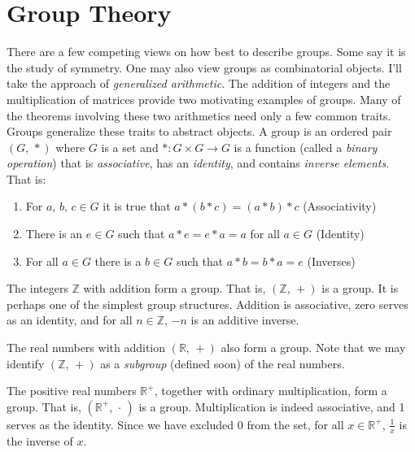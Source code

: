 \documentclass{article}
\theoremstyle{plain}
\theoremstyle{normal}
\newenvironment{example}{%
    \pushQED{\qed}\renewcommand{\qedsymbol}{$\blacksquare$}\examplex%
}{%
    \popQED\endexamplex%
}
\newenvironment{definition}{%
    \pushQED{\qed}\renewcommand{\qedsymbol}{$\blacksquare$}\definitionx%
}{%
    \popQED\enddefinitionx%
}
\begin{document}
    \section{Group Theory}
        There are a few competing views on how best to describe groups. Some
        say it is the study of symmetry. One may also view groups as
        combinatorial objects. I'll take the approach of
        \textit{generalized arithmetic}. The addition of integers and the
        multiplication of matrices provide two motivating examples of groups.
        Many of the theorems involving these two arithmetics need only a few
        common traits. Groups generalize these traits to abstract objects.
        \begin{definition}[\textbf{Group}]
            A group is an ordered pair $(G,\,*)$ where $G$ is a set and
            $*:G\times{G}\rightarrow{G}$ is a function (called a
            \textit{binary operation}) that is \textit{associative}, has an
            \textit{identity}, and contains \textit{inverse elements}. That is:
            \begin{enumerate}
                \item For $a,\,b,\,c\in{G}$ it is true that
                    $a*(b*c)=(a*b)*c$ (Associativity)
                \item There is an $e\in{G}$ such that $a*e=e*a=a$ for all
                    $a\in{G}$ (Identity)
                \item For all $a\in{G}$ there is a $b\in{G}$ such that
                    $a*b=b*a=e$ (Inverses)
            \end{enumerate}
        \end{definition}
        \begin{example}
            The integers $\mathbb{Z}$ with addition form a group. That is,
            $(\mathbb{Z},\,+)$ is a group. It is perhaps one of the simplest
            group structures. Addition is associative, zero serves as an
            identity, and for all $n\in\mathbb{Z}$, $-n$ is an additive inverse.
        \end{example}
        \begin{example}
            The real numbers with addition $(\mathbb{R},\,+)$ also form a group.
            Note that we may identify $(\mathbb{Z},\,+)$ as a \textit{subgroup}
            (defined soon) of the real numbers.
        \end{example}
        \begin{example}
            The positive real numbers $\mathbb{R}^{+}$, together with ordinary
            multiplication, form a group. That is,
            $(\mathbb{R}^{+},\,\cdot\,)$ is a group. Multiplication is indeed
            associative, and 1 serves as the identity. Since we have excluded
            0 from the set, for all $x\in\mathbb{R}^{+}$, $\frac{1}{x}$ is the
            inverse of $x$.
        \end{example}
\end{document}
